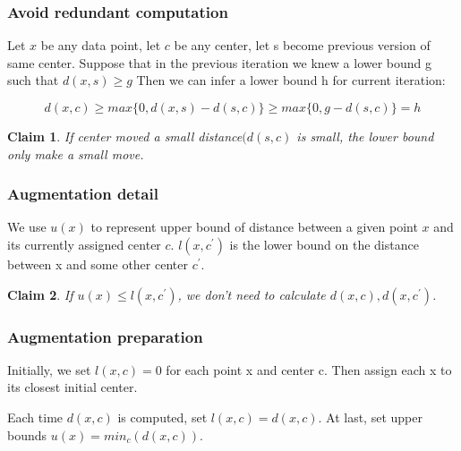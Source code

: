 \documentclass[9pt]{beamer}
\newtheorem{claim}{Claim}
\newcommand{\ccp}[1]{{\color{purple}#1}}
\begin{document}
\begin{frame}
	\frametitle{Avoid redundant computation}
	Let $x$ be any data point, let $c$ be any center, let s become previous version of same center. Suppose that in the previous iteration we knew a lower bound g such that $d(x, s) \ge g$ Then we can infer a lower bound h for current iteration: \par
	\begin{equation*}
		d(x, c) \ge max\{0, d(x,s)-d(s,c)\} \ge max\{0, g-d(s,c)\} = h
	\end{equation*}
	\pause
	\begin{claim}
		\ccp{If center moved a small distance$(d(s,c)$ is small}, the lower bound only make a small move.
	\end{claim}
\end{frame}



\begin{frame}
	\frametitle{Augmentation detail}
	We use $u(x)$ to represent upper bound of distance between a given point $x$ and its currently assigned center $c$. $l(x,c^{\prime})$ is the lower bound on the distance between x and some other center $c^{\prime}$.\par
	\begin{claim}
		If $u(x) \le l(x,c^{\prime}) $, we don't need to calculate $d(x,c), d(x, c^{\prime})$. \par
	\end{claim}
\end{frame}

\begin{frame}
	\frametitle{Augmentation preparation}
	Initially, we set $l(x,c)=0$ for each point x and center c. Then assign each x to its closest initial center.\par
	Each time $d(x,c)$ is computed, set $l(x,c)=d(x,c)$. At last, set upper bounds $u(x) = min_c(d(x,c))$.

\end{frame}
\end{document}
